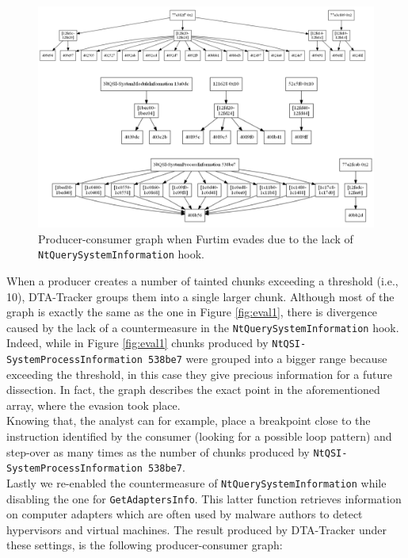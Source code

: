 \documentclass[LaM,binding=0.6cm]{sapthesis}
\begin{document}
\begin{figure}[h!]
\centering
\includegraphics[scale=.5]{images/eval2}
\caption{Producer-consumer graph when Furtim evades due to the lack of \texttt{NtQuerySystemInformation} hook.}
\end{figure}

When a producer creates a number of tainted chunks exceeding a threshold (i.e., 10), DTA-Tracker groups them into a single larger chunk. Although most of the graph is exactly the same as the one in Figure \autoref{fig:eval1}, there is divergence caused by the lack of a countermeasure in the \texttt{NtQuerySystemInformation} hook. Indeed, while in Figure \autoref{fig:eval1} chunks produced by \texttt{NtQSI-SystemProcessInformation 538be7} were grouped into a bigger range because exceeding the threshold, in this case they give precious information for a future dissection. In fact, the graph describes the exact point in the aforementioned array, where the evasion took place.\\ 
Knowing that, the analyst can for example, place a breakpoint close to the instruction identified by the consumer (looking for a possible loop pattern) and step-over as many times as the number of chunks produced by \texttt{NtQSI-SystemProcessInformation 538be7}.\\

Lastly we re-enabled the countermeasure of \texttt{NtQuerySystemInformation} while disabling the one for \texttt{GetAdaptersInfo}. This latter function retrieves information on computer adapters which are often used by malware authors to detect hypervisors and virtual machines. The result produced by DTA-Tracker under these settings, is the following producer-consumer graph:
\end{document}
